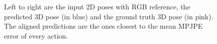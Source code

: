 \begin{figure}[h]
    \caption{Left to right are the input 2D poses with RGB reference, the predicted 3D pose (in blue) and the ground truth 3D pose (in pink). The aligned predictions are the ones closest to the mean MPJPE error of every action.}
    \label{fig:zv}
\end{figure}

















